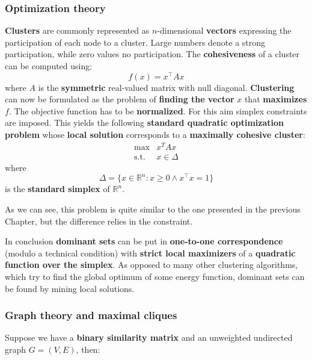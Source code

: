 \subsubsection{Optimization theory}
\textbf{Clusters} are commonly represented as $n$-dimensional \textbf{vectors} expressing the participation of each node to a cluster. Large numbers denote a strong participation, while zero values no participation. The \textbf{cohesiveness} of a cluster can be computed using:
\begin{equation}
f(x)=x^\top Ax
\end{equation}
where $A$ is the \textbf{symmetric} real-valued matrix with null diagonal. \textbf{Clustering} can now be formulated as the problem of \textbf{finding the vector} $x$ that \textbf{maximizes} $f$. The objective function has to be \textbf{normalized}. For this aim simplex constraints are imposed. This yields the following \textbf{standard quadratic optimization problem} whose \textbf{local solution} corresponds to a \textbf{maximally cohesive cluster}:
\begin{equation}\label{SPQ}
\begin{array}{lcl}
\text{max} & x^TAx \\
\text{s.t.} & x \in \Delta
\end{array}
\end{equation}
where
\begin{equation}
\Delta=\{x\in\mathbb{R}^n:x\geq 0 \land x^\top x = 1\}
\end{equation}
is the \textbf{standard simplex} of $\mathbb{R}^n$.\\


As we can see, this problem is quite similar to the one presented in the previous Chapter, but the difference relies in the constraint.

In conclusion \textbf{dominant sets} can be put in \textbf{one-to-one correspondence} (modulo a technical condition) with \textbf{strict local maximizers} of a \textbf{quadratic function over the simplex}. As opposed to many other clustering algorithms, which try to find the global optimum of some energy function, dominant sets can be found by mining local solutions.

\subsubsection{Graph theory and maximal cliques}
Suppose we have a \textbf{binary similarity matrix} and an unweighted undirected graph $G = (V,E)$, then:

